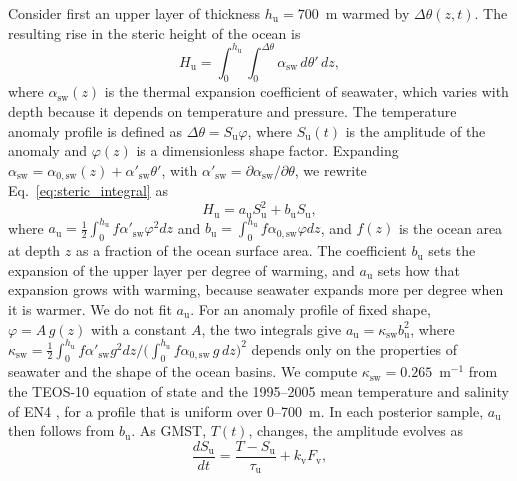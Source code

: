 \documentclass[draft,linenumbers]{agujournal2025}
\begin{document}
Consider first an upper layer of thickness $h_{\mathrm{u}} = 700$~m warmed by $\Delta\theta(z,t)$. The resulting rise in the steric height of the ocean is
	\begin{equation}
	H_{\mathrm{u}} = \int_0^{h_{\mathrm{u}}}\!\int_0^{\Delta\theta} \alpha_{\mathrm{sw}}\,d\theta'\,dz,
	\label{eq:steric_integral}
	\end{equation}
where $\alpha_{\mathrm{sw}}(z)$ is the thermal expansion coefficient of seawater, which varies with depth because it depends on temperature and pressure. The temperature anomaly profile is defined as $\Delta\theta = S_{\mathrm{u}}\varphi$, where $S_{\mathrm{u}}(t)$ is the amplitude of the anomaly and $\varphi(z)$ is a dimensionless shape factor. Expanding $\alpha_{\mathrm{sw}} = \alpha_{0,\mathrm{sw}}(z) + \alpha'_{\mathrm{sw}}\theta'$, with $\alpha'_{\mathrm{sw}} = \partial\alpha_{\mathrm{sw}}/\partial\theta$, we rewrite Eq.~\ref{eq:steric_integral} as 
	\begin{equation}
	H_{\mathrm{u}} = a_{\mathrm{u}} S_{\mathrm{u}}^2 + b_{\mathrm{u}} S_{\mathrm{u}},
	\label{eq:thermo_upper}
	\end{equation}
where $a_{\mathrm{u}} = \tfrac{1}{2}\int_0^{h_{\mathrm{u}}} f\alpha'_{\mathrm{sw}}\varphi^2dz$ and $b_{\mathrm{u}} = \int_0^{h_{\mathrm{u}}} f\alpha_{0,\mathrm{sw}}\varphi dz$, and $f(z)$ is the ocean area at depth $z$ as a fraction of the ocean surface area. The coefficient $b_{\mathrm{u}}$ sets the expansion of the upper layer per degree of warming, and $a_{\mathrm{u}}$ sets how that expansion grows with warming, because seawater expands more per degree when it is warmer. We do not fit $a_{\mathrm{u}}$. For an anomaly profile of fixed shape, $\varphi = A\,g(z)$ with a constant $A$, the two integrals give $a_{\mathrm{u}} = \kappa_{\mathrm{sw}} b_{\mathrm{u}}^2$, where $\kappa_{\mathrm{sw}} = \tfrac{1}{2}\int_0^{h_{\mathrm{u}}} f\alpha'_{\mathrm{sw}}g^2dz \big/ \bigl(\int_0^{h_{\mathrm{u}}} f\alpha_{0,\mathrm{sw}}\,g\,dz\bigr)^2$ depends only on the properties of seawater and the shape of the ocean basins. We compute $\kappa_{\mathrm{sw}} = 0.265$~m$^{-1}$ from the TEOS-10 equation of state \citep{IOC2010} and the 1995--2005 mean temperature and salinity of EN4 \citep{Good2013}, for a profile that is uniform over 0--700~m. In each posterior sample, $a_{\mathrm{u}}$ then follows from $b_{\mathrm{u}}$. As GMST, $T(t)$, changes, the amplitude evolves as
	\begin{equation}
	\frac{dS_{\mathrm{u}}}{dt} = \frac{T - S_{\mathrm{u}}}{\tau_{\mathrm{u}}} + k_{\mathrm{v}}F_{\mathrm{v}},
	\label{eq:thermo_su}
	\end{equation}
\end{document}
